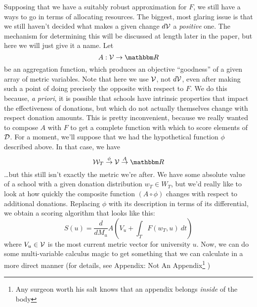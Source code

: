 \documentclass[paper.tex]{subfiles}
\begin{document}
	Supposing that we have a suitably robust approximation for $F$, we still have a ways to go in terms of allocating resources. The biggest, most glaring issue is that we still haven't decided what makes a given change $d\mathcal{V}$ a \emph{positive} one. The mechanism for determining this will be discussed at length later in the paper, but here we will just give it a name. Let
	\begin{equation}
		A : \V \to \Re
	\end{equation}
	be an aggregation function, which produces an objective ``goodness'' of a given array of metric variables. Note that here we use $\mathcal{V}$, not $d\mathcal{V}$, even after making such a point of doing precisely the opposite with respect to $F$. We do this because, \emph{a priori}, it is possible that schools have intrinsic properties that impact the effectiveness of donations, but which do not actually themselves change with respect donation amounts. This is pretty inconvenient, because we really wanted to compose $A$ with $F$ to get a complete function with which to score elements of $\mathcal{D}$. For a moment, we'll suppose that we had the hypothetical function $\phi$ described above. In that case, we have
	\[ \W_T \overset{\phi}{\to} \V \overset{A}{\to} \Re \] 
	\ldots but this still isn't exactly the metric we're after. We have some absolute value of a school with a given donation distribution $w_T \in W_T$, but we'd really like to look at how quickly the composite function $(A \circ \phi)$ changes with respect to additional donations. Replacing $\phi$ with its description in terms of its differential, we obtain a scoring algorithm that looks like this:
	\begin{equation}
		S(u) =  \frac{d}{dM_u} A\left(V_u + \int_{T} F(w_T, u)~dt\right)
	\end{equation}
	where $V_u \in \mathcal{V}$ is the most current metric vector for university $u$. Now, we can do some multi-variable calculus magic to get something that we can calculate in a more direct manner (for details, see Appendix: {\sc Not An Appendix}\footnote{Any surgeon worth his salt knows that an appendix belongs \emph{inside} of the body} )
\end{document}
